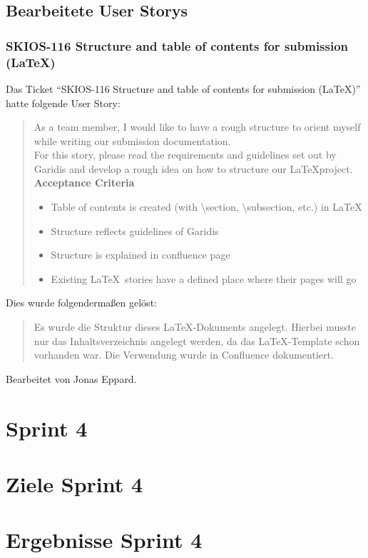 \subsection{Bearbeitete User Storys}
\subsubsection{SKIOS-116 Structure and table of contents for submission (\LaTeX)}
Das Ticket \enquote{SKIOS-116 Structure and table of contents for submission (\LaTeX)}
hatte folgende User Story:
\begin{quotation}
    As a team member, I would like to have a rough structure to orient myself while writing our submission documentation.\\
    For this story, please read the requirements and guidelines set out by Garidis and develop a rough idea on how to structure our \LaTeX project.\\
    \textbf{Acceptance Criteria}
    \begin{itemize}
        \item Table of contents is created (with \textbackslash{}section, \textbackslash{}subsection, etc.) in \LaTeX
        \item Structure reflects guidelines of Garidis
        \item Structure is explained in confluence page
        \item Existing \LaTeX~stories have a defined place where their pages will go
    \end{itemize}
\end{quotation}
Dies wurde folgendermaßen gelöst:
\begin{quotation}
    Es wurde die Struktur dieses \LaTeX-Dokuments angelegt. Hierbei musste nur das Inhaltsverzeichnis
    angelegt werden, da das \LaTeX-Template schon vorhanden war.
    Die Verwendung wurde in Confluence dokumentiert.
\end{quotation}
Bearbeitet von Jonas Eppard.

\section{Sprint 4}

\section{Ziele Sprint 4}

\section{Ergebnisse Sprint 4}

